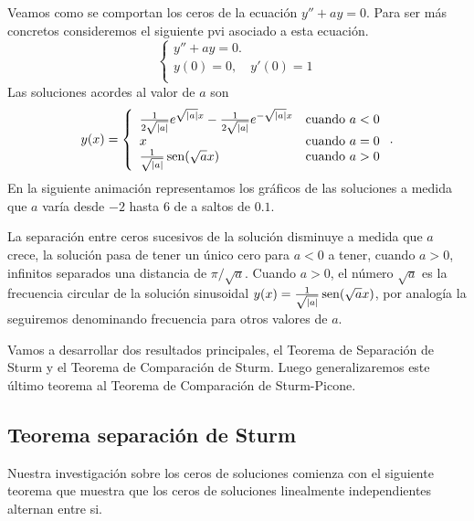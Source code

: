 Veamos como se comportan los ceros de la ecuación $y''+ay=0$. Para ser más concretos consideremos el siguiente pvi asociado a esta ecuación.
\[\left\{\begin{array}{l}
    y''+ay=0.\\
    y(0)=0,\quad y'(0)=1\\
  \end{array}\right.
  \]
Las soluciones  acordes al valor de $a$ son
\[
y(x)=\left\{\begin{array}{l l}
    \frac{1}{2\sqrt{|a|}}e^{\sqrt{|a|}x}- \frac{1}{2\sqrt{|a|}}e^{-\sqrt{|a|}x} &\text{cuando } a<0\\
     x &\text{cuando } a=0\\
     \frac{1}{\sqrt{|a|}}\operatorname{sen}(\sqrt{a}x) &\text{cuando } a>0\\
\end{array}\right..
\]
En la siguiente animación representamos los gráficos de las soluciones a medida que $a$ varía desde $-2$ hasta $6$ de a saltos de $0.1$.  
\begin{center}
\end{center}
La separación entre ceros sucesivos de la  solución disminuye a medida que $a$ crece, la solución pasa de tener un único cero para $a<0$  a tener, cuando $a>0$, infinitos separados una distancia de $\pi/\sqrt{a}$. Cuando $a>0$, el número $\sqrt{a}$ es la frecuencia circular  de la solución sinusoidal $y(x)=   \frac{1}{\sqrt{|a|}}\operatorname{sen}(\sqrt{a}x)$, por analogía la seguiremos denominando frecuencia para otros valores de $a$.

Vamos a desarrollar dos resultados principales, el Teorema de Separación de Sturm y el Teorema de Comparación de Sturm. Luego generalizaremos este último teorema al Teorema de Comparación de Sturm-Picone.

\subsection{Teorema separación de Sturm}

Nuestra investigación sobre los ceros de soluciones comienza con el siguiente teorema que muestra que los ceros de soluciones linealmente independientes alternan entre si.





